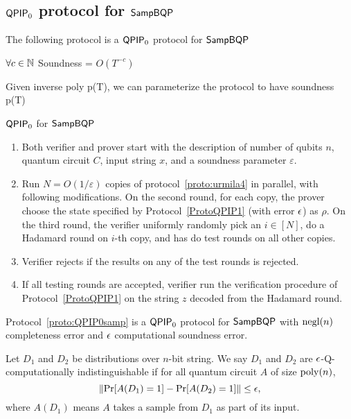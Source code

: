 \subsection{$\operatorname{\mathsf{QPIP}}_0$ protocol for $\operatorname{\mathsf{SampBQP}}$}

The following protocol is a $\operatorname{\mathsf{QPIP}}_0$ protocol for $\operatorname{\mathsf{SampBQP}}$

$\forall c\in\mathbb{N}$ Soundness = $O(T^{-c})$

Given inverse poly p(T), we can parameterize the protocol to have soundness p(T)




\begin{protocol}{$\operatorname{\mathsf{QPIP}}_0$ for $\operatorname{\mathsf{SampBQP}}$}
\label{proto:QPIP0samp}
\begin{enumerate}
    \item Both verifier and prover start with the description of number of qubits $n$, quantum circuit $C$, input string $x$, and  a soundness parameter $\varepsilon$.
    \item Run $N=O(1/\varepsilon)$ copies of protocol~\ref{proto:urmila4} in parallel, with following modifications. On the second round, for each copy, the prover choose the state specified by Protocol~\ref{ProtoQPIP1}  (with error $\epsilon$) as $\rho$. On the third round, the verifier uniformly randomly pick an $i\in [N]$, do a Hadamard round on $i$-th copy, and has do test rounds on all other copies.
    \item \label{step:multi-testing}Verifier rejects if the results on any of the test rounds is rejected. 
    \item If all testing rounds are accepted, verifier run the verification procedure of Protocol~\ref{ProtoQPIP1} on the string $z$ decoded from the Hadamard round.
\end{enumerate}
\end{protocol}

\begin{theorem}\label{thm:urmila-binding}
    Protocol~\ref{proto:QPIP0samp} is a $\operatorname{\mathsf{QPIP}}_0$ protocol for $\operatorname{\mathsf{SampBQP}}$ with $\operatorname{negl}(n)$ completeness error and $\epsilon$ computational soundness error. 
\end{theorem}

\begin{definition}
Let  $D_1$ and $D_2$ be distributions over $n$-bit string.  We say $D_1$ and $D_2$  are $\epsilon$-Q-computationally indistinguishable if for all quantum circuit $A$ of size $\operatorname*{\operatorname{poly}}(n)$, $$\left\|\Pr[A({D_1})=1]-\Pr[A({D_2})=1]  \right\| \leq \epsilon,$$  where $A(D_1)$ means $A$ takes a sample from $D_1$ as part of its input. 
\end{definition}


